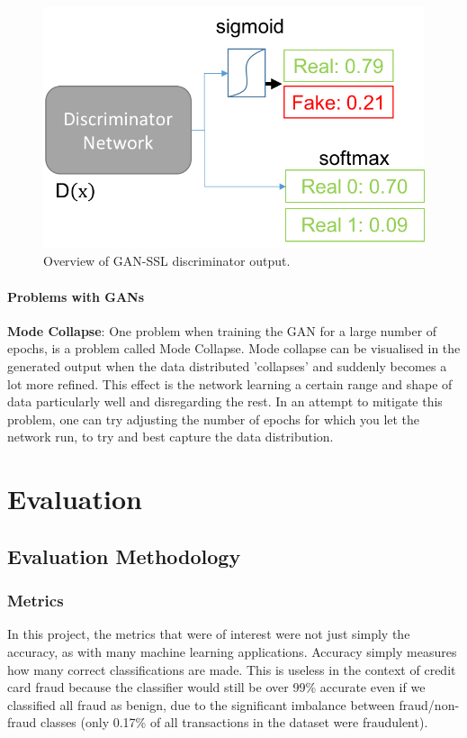 \documentclass[12pt,a4paper,twoside]{report}
\begin{document}
\begin{figure}[H]
\centering
\includegraphics[scale=0.8]{gan-ssl}
\caption{Overview of GAN-SSL discriminator output.}
\label{fig:gan-ssl}
\end{figure}

\subsubsection{Problems with GANs}

\textbf{Mode Collapse}: One problem when training the GAN for a large number of epochs, is a problem called Mode Collapse. Mode collapse can be visualised in the generated output when the data distributed 'collapses' and suddenly becomes a lot more refined. This effect is the network learning a certain range and shape of data particularly well and disregarding the rest. In an attempt to mitigate this problem, one can try adjusting the number of epochs for which you let the network run, to try and best capture the data distribution. 


\chapter{Evaluation}
\section{Evaluation Methodology}
\subsection{Metrics}
In this project, the metrics that were of interest were not just simply the accuracy, as with many machine learning applications. Accuracy simply measures how many correct classifications are made. This is useless in the context of credit card fraud because the classifier would still be over 99\% accurate even if we classified all fraud as benign, due to the significant imbalance between fraud/non-fraud classes (only 0.17\% of all transactions in the dataset were fraudulent). 
\end{document}
